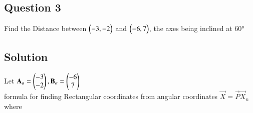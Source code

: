 \documentclass[journal,12pt,twocolumn]{IEEEtran}
\begin{document}
\subsection{Question 3}
\item 
{}
Find the Distance between $\begin{pmatrix}-3 , -2\end{pmatrix}$ and $\begin{pmatrix}-6 , 7\end{pmatrix}$, the axes being inclined at \ang{60}\degree
\subsection{Solution}
Let $\mathbf{A}_a=\begin{pmatrix}-3 \\ -2\end{pmatrix} , \mathbf{B}_a =\begin{pmatrix}-6 \\ 7\end{pmatrix}$\\
formula for finding Rectangular coordinates from angular coordinates
 $\vec{X} = \vec{P}\vec{X}_n$
\\where
\end{document}
